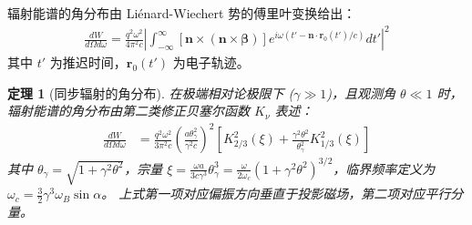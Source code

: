 \documentclass[12pt,oneside]{ctexart}
\theoremstyle{definition}
\theoremstyle{plain}
\newtheorem{theorem}[definition]{定理}
\theoremstyle{remark}
\begin{document}
辐射能谱的角分布由 Liénard-Wiechert 势的傅里叶变换给出：
\begin{align}
    \frac{dW}{d\Omega d\omega} = \frac{q^2 \omega^2}{4\pi^2 c} \left| \int_{-\infty}^{\infty} [\mathbf{n} \times (\mathbf{n} \times \boldsymbol{\beta})] e^{i\omega(t' - \mathbf{n}\cdot\mathbf{r}_0(t')/c)} dt' \right|^2 \label{eq:fundamental_rad}
\end{align}
其中 $t'$ 为推迟时间，$\mathbf{r}_0(t')$ 为电子轨迹。

\begin{theorem}[同步辐射的角分布]
    在极端相对论极限下 ($\gamma \gg 1$)，且观测角 $\theta \ll 1$ 时，辐射能谱的角分布由第二类修正贝塞尔函数 $K_\nu$ 表述：
    \begin{align}
        \frac{dW}{d\Omega d\omega} &= \frac{q^2 \omega^2}{3\pi^2 c} \left( \frac{a \theta_\gamma^2}{\gamma^2 c} \right)^2 \left[ K_{2/3}^2(\xi) + \frac{\gamma^2 \theta^2}{\theta_\gamma^2} K_{1/3}^2(\xi) \right] \label{eq:angular_dist}
    \end{align}
    其中 $\theta_\gamma = \sqrt{1 + \gamma^2 \theta^2}$，宗量 $\xi = \frac{\omega a}{3c\gamma^3} \theta_\gamma^3 = \frac{\omega}{2\omega_c} (1+\gamma^2\theta^2)^{3/2}$，临界频率定义为 $\omega_c = \frac{3}{2}\gamma^3 \omega_B \sin\alpha$。
    上式第一项对应偏振方向垂直于投影磁场，第二项对应平行分量。
\end{theorem}
\end{document}
